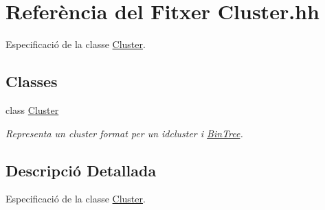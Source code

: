 \hypertarget{_cluster_8hh}{}\section{Referència del Fitxer Cluster.\+hh}
\label{_cluster_8hh}


Especificació de la classe \hyperlink{class_cluster}{Cluster}.  


\subsection*{Classes}
\begin{DoxyCompactItemize}
\item 
class \hyperlink{class_cluster}{Cluster}
\begin{DoxyCompactList}\small\item\em Representa un cluster format per un idcluster i \hyperlink{class_bin_tree}{Bin\+Tree}. \end{DoxyCompactList}\end{DoxyCompactItemize}


\subsection{Descripció Detallada}
Especificació de la classe \hyperlink{class_cluster}{Cluster}. 

